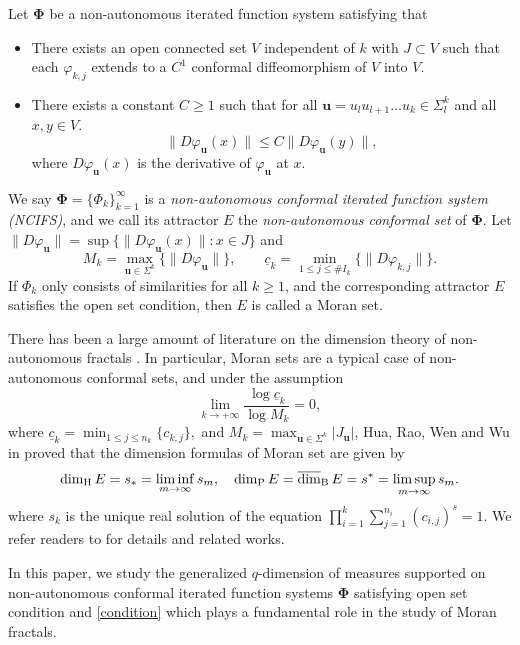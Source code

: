 \documentclass[12pt]{amsart}
\theoremstyle{plain}
\theoremstyle{definition}
\theoremstyle{remark}
\newcommand{\bu}{\mathbf{u}}
\newcommand\pkd{\mbox{\rm dim}_{\rm P}\,} %
\newcommand\hdd{\mbox{\rm dim}_{\rm H}\,} %
\newcommand\ubd{\overline{\mbox{\rm dim}}_{\rm B}\,} %
\begin{document}
Let $\boldsymbol{\Phi}$ be a non-autonomous iterated function system satisfying that
\begin{itemize}
\item[(iv).] There exists an open connected set $V$ independent of $k$ with $J\subset V$ such that each $\varphi_{k, j}$ extends to a $C^1$ conformal diffeomorphism of $V$ into $V$.
\item[(v).] There exists a constant $C\ge 1$ such that for all $\bu=u_lu_{l+1}\ldots u_k\in\Sigma_l^k$ and   all $x, y\in V$.
$$
\|D\varphi_{\bu}(x)\|\le C\|D\varphi_{\bu}(y)\|,
$$ 
where $D\varphi_\bu(x)$ is the derivative of $\varphi_\bu$  at $x$.
\end{itemize}
We say $\boldsymbol{\Phi}=\{\Phi_k\}_{k=1}^\infty$ is a \emph{non-autonomous conformal iterated function system (NCIFS)}, and we call its attractor $E$ the \emph{non-autonomous conformal set} of $\boldsymbol{\Phi}$.  Let $\|D\varphi_\bu\| =\sup\{\|D\varphi_\bu(x)\| : x \in J\}$  and
\begin{equation}\label{Mk}
 M_k=\max_{\mathbf{u} \in \Sigma^k} \{\|D\varphi_\mathbf{u}\|\}, \quad  \quad
\underline c_k=\min_{1\le j \le \# I_k} \{\|D\varphi_{k, j}\|\}.
\end{equation}
If $\Phi_k$ only consists of similarities for all $k\geq 1$, and the corresponding attractor $E$ satisfies the open set condition, then $E$ is called a Moran set. 

There has been a large amount of literature on the dimension theory of non-autonomous fractals \cite{GM, MW,RM}. In particular, Moran sets are a typical case of non-autonomous conformal sets, and under the assumption 
\begin{equation}\label{condition}
\lim_{k\to +\infty} \frac{\log\underline c_k}{\log M_k}=0,
\end{equation}
where $\underline{c}_k=\min_{1\le j \le n_k} \{c_{k,j}\},$ and $M_k=\max_{\mathbf{u} \in \Sigma^k} \lvert J_\mathbf{u} \rvert$, Hua, Rao, Wen and Wu in \cite{HRWW} proved that the dimension formulas of Moran set are given by
	\begin{equation*}
		\hdd E=s_{\ast }=\liminf_{m\rightarrow \infty }s_{m}, \quad \pkd E=\ubd E=s^{\ast }=\limsup_{m\rightarrow \infty }s_{m}.
	\end{equation*}
where $s_{k}$ is the unique real solution
	of the equation $\prod\nolimits_{i=1}^{k} \sum\nolimits_{j=1}^{n_{i}}(c_{i,j})^{s}=1$.  We refer readers to  \cite{GM,Hua,RM, Wen00} for details and related works. 

In this paper, we study the  generalized $q$-dimension of measures supported on non-autonomous conformal iterated function systems $\boldsymbol{\Phi}$ satisfying open set condition and \eqref{condition} which plays a fundamental role in the study  of Moran fractals.
  
\end{document}
